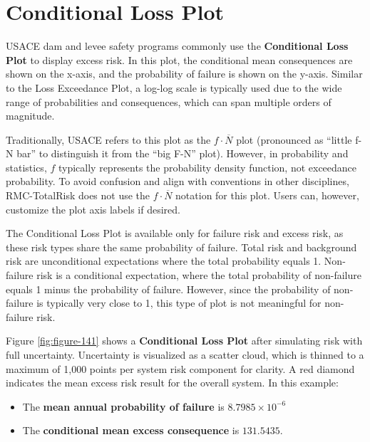 \documentclass[
]{book}
\begin{document}
\hypertarget{conditional-loss-plot}{%
\section{Conditional Loss Plot}\label{conditional-loss-plot}}

USACE dam and levee safety programs commonly use the \textbf{Conditional Loss Plot} to display excess risk. In this plot, the conditional mean consequences are shown on the x-axis, and the probability of failure is shown on the y-axis. Similar to the Loss Exceedance Plot, a log-log scale is typically used due to the wide range of probabilities and consequences, which can span multiple orders of magnitude.

Traditionally, USACE refers to this plot as the \(f \cdot \overline{N}\) plot (pronounced as ``little f-N bar'' to distinguish it from the ``big F-N'' plot). However, in probability and statistics, \(f\) typically represents the probability density function, not exceedance probability. To avoid confusion and align with conventions in other disciplines, RMC-TotalRisk does not use the \(f \cdot \overline{N}\) notation for this plot. Users can, however, customize the plot axis labels if desired.

The Conditional Loss Plot is available only for failure risk and excess risk, as these risk types share the same probability of failure. Total risk and background risk are unconditional expectations where the total probability equals 1. Non-failure risk is a conditional expectation, where the total probability of non-failure equals 1 minus the probability of failure. However, since the probability of non-failure is typically very close to 1, this type of plot is not meaningful for non-failure risk.

Figure \ref{fig:figure-141} shows a \textbf{Conditional Loss Plot} after simulating risk with full uncertainty. Uncertainty is visualized as a scatter cloud, which is thinned to a maximum of 1,000 points per system risk component for clarity. A red diamond indicates the mean excess risk result for the overall system. In this example:

\begin{itemize}
\item
  The \textbf{mean annual probability of failure} is \(8.7985\times10^{-6}\)
\item
  The \textbf{conditional mean excess consequence} is \(131.5435\).
\end{itemize}
\end{document}
